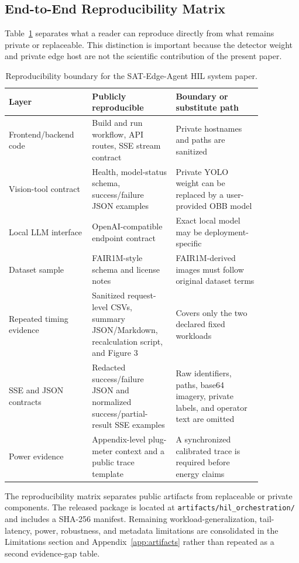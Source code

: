 \subsection{End-to-End Reproducibility Matrix}

Table~\ref{tab:repro_matrix} separates what a reader can reproduce directly from what remains private or replaceable. This distinction is important because the detector weight and private edge host are not the scientific contribution of the present paper.

\begin{table}[htbp]
\centering
\renewcommand{\arraystretch}{1.16}
\setlength{\tabcolsep}{4pt}
\caption{Reproducibility boundary for the SAT-Edge-Agent HIL system paper.}
\label{tab:repro_matrix}
\begin{tabular}{p{0.28\linewidth}p{0.28\linewidth}p{0.30\linewidth}}
\toprule
\rowcolor{gray!12}
\textbf{Layer} & \textbf{Publicly reproducible} & \textbf{Boundary or substitute path} \\
\midrule
Frontend/backend code & Build and run workflow, API routes, SSE stream contract & Private hostnames and paths are sanitized \\
\rowcolor{graybg}
Vision-tool contract & Health, model-status schema, success/failure JSON examples & Private YOLO weight can be replaced by a user-provided OBB model \\
Local LLM interface & OpenAI-compatible endpoint contract & Exact local model may be deployment-specific \\
\rowcolor{graybg}
Dataset sample & FAIR1M-style schema and license notes & FAIR1M-derived images must follow original dataset terms \\
Repeated timing evidence & Sanitized request-level CSVs, summary JSON/Markdown, recalculation script, and Figure 3 & Covers only the two declared fixed workloads \\
\rowcolor{graybg}
SSE and JSON contracts & Redacted success/failure JSON and normalized success/partial-result SSE examples & Raw identifiers, paths, base64 imagery, private labels, and operator text are omitted \\
Power evidence & Appendix-level plug-meter context and a public trace template & A synchronized calibrated trace is required before energy claims \\
\bottomrule
\end{tabular}
\end{table}

The reproducibility matrix separates public artifacts from replaceable or private components. The released package is located at \texttt{artifacts/hil\_orchestration/} and includes a SHA-256 manifest. Remaining workload-generalization, tail-latency, power, robustness, and metadata limitations are consolidated in the Limitations section and Appendix~\ref{app:artifacts} rather than repeated as a second evidence-gap table.
